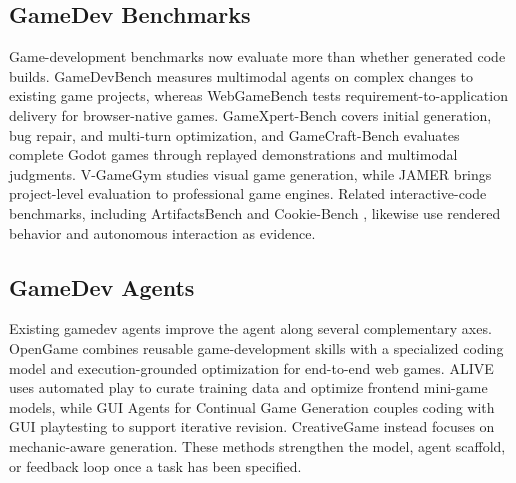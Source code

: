 \documentclass{article}
\begin{document}
\subsection{GameDev Benchmarks} 
Game-development benchmarks now evaluate more than whether generated code builds. GameDevBench \cite{chi2026gamedevbench} measures multimodal agents on complex changes to existing game projects, whereas WebGameBench \cite{zhang2026webgamebench} tests requirement-to-application delivery for browser-native games. GameXpert-Bench \cite{chen2026gamexpert} covers initial generation, bug repair, and multi-turn optimization, and GameCraft-Bench \cite{luo2026gamecraft} evaluates complete Godot games through replayed demonstrations and multimodal judgments. V-GameGym \cite{zhang2026v} studies visual game generation, while JAMER \cite{sun2026jamer} brings project-level evaluation to professional game engines. Related interactive-code benchmarks, including ArtifactsBench \cite{zhang2025artifactsbench} and Cookie-Bench \cite{yang2026cookie}, likewise use rendered behavior and autonomous interaction as evidence.


\subsection{GameDev Agents}
Existing gamedev agents improve the agent along several complementary axes. OpenGame \cite{jiang2026opengame} combines reusable game-development skills with a specialized coding model and execution-grounded optimization for end-to-end web games. ALIVE \cite{zhangbringing} uses automated play to curate training data and optimize frontend mini-game models, while GUI Agents for Continual Game Generation \cite{huang2026gui} couples coding with GUI playtesting to support iterative revision. CreativeGame \cite{ma2026creativegame} instead focuses on mechanic-aware generation. These methods strengthen the model, agent scaffold, or feedback loop once a task has been specified.
\end{document}
